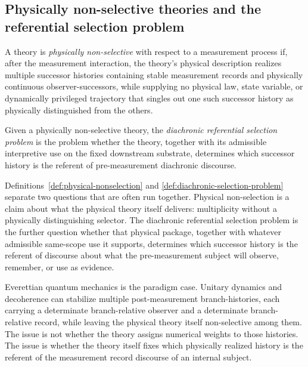 \subsection{Physically non-selective theories and the referential selection problem}

\begin{definition}
\label{def:physical-nonselection}
A theory is \emph{physically non-selective} with respect to a measurement process if, after the
measurement interaction, the theory's physical description realizes multiple successor histories
containing stable measurement records and physically continuous observer-successors, while
supplying no physical law, state variable, or dynamically privileged trajectory that singles out one
such successor history as physically distinguished from the others.
\end{definition}

\begin{definition}
\label{def:diachronic-selection-problem}
Given a physically non-selective theory, the \emph{diachronic referential selection problem} is the
problem whether the theory, together with its admissible interpretive use on the fixed downstream
substrate, determines which successor history is the referent of pre-measurement diachronic discourse.
\end{definition}

Definitions~\ref{def:physical-nonselection} and \ref{def:diachronic-selection-problem} separate two
questions that are often run together. Physical non-selection is a claim about what the physical theory
itself delivers: multiplicity without a physically distinguishing selector. The diachronic referential
selection problem is the further question whether that physical package, together with whatever
admissible same-scope use it supports, determines which successor history is the referent of discourse
about what the pre-measurement subject will observe, remember, or use as evidence.

Everettian quantum mechanics is the paradigm case. Unitary dynamics and decoherence can stabilize
multiple post-measurement branch-histories, each carrying a determinate branch-relative observer and
a determinate branch-relative record, while leaving the physical theory itself non-selective among
them. The issue is not whether the theory assigns numerical weights to those histories. The issue is
whether the theory itself fixes which physically realized history is the referent of the measurement
record discourse of an internal subject.

